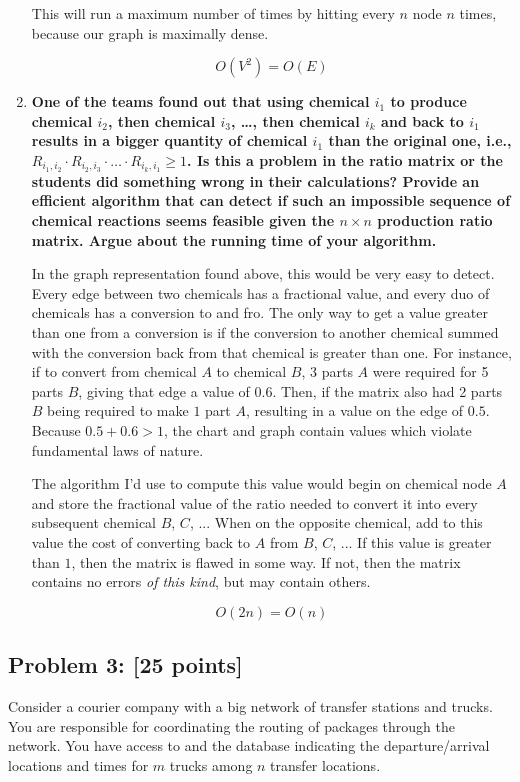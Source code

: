 \documentclass[11pt]{article}
\begin{document}
\begin{enumerate}[label=\textbf{\Alph*.}]
This will run a maximum number of times by hitting every $n$ node $n$ times,
because our graph is maximally dense.

$$O(V^2) = O(E)$$

\item  \textbf{One of the teams found out that using chemical
$i_1$ to produce chemical $i_2$, then chemical $i_3$, \dots, then
chemical $i_k$ and back to $i_1$ results in a bigger quantity of
chemical $i_1$ than the original one, i.e., $R_{i_1,i_2} \cdot
R_{i_2,i_3} \cdot \ldots \cdot R_{i_k,i_1} \geq 1$. Is this a problem
in the ratio matrix or the students did something wrong in their
calculations? Provide an efficient algorithm that can detect if such
an impossible sequence of chemical reactions seems feasible given the
$n \times n$ production ratio matrix. Argue about the running time of
your algorithm.}

In the graph representation found above, this would be very easy to
detect. Every edge between two chemicals has a fractional value, and
every duo of chemicals has a conversion to and fro. The only way
to get a value greater than one from a conversion is if the conversion
to another chemical summed with the conversion back from that chemical
is greater than one. For instance, if to convert from chemical $A$ to
chemical $B$, 3 parts $A$ were required for 5 parts $B$, giving that
edge a value of $0.6$. Then, if the matrix also had 2 parts $B$
being required to make $1$ part $A$, resulting in a value on the edge
of $0.5$. Because $0.5 + 0.6 > 1$, the chart and graph contain
values which violate fundamental laws of nature.

The algorithm I'd use to compute this value would begin on chemical 
node $A$ and store the fractional value of the ratio needed to convert
it into every subsequent chemical $B$, $C$, ... When on the opposite
chemical, add to this value the cost of converting back to $A$ from 
$B$, $C$, ... If this value is greater than $1$, then the matrix is
flawed in some way. If not, then the matrix contains no errors \emph{of
this kind}, but may contain others. 

$$O(2n) = O(n)$$

\end{enumerate}

\subsection*{Problem 3: [25 points]} Consider a courier company with
a big network of transfer stations and trucks. You are responsible for
coordinating the routing of packages through the network. You have
access to and the database indicating the departure/arrival locations
and times for $m$ trucks among $n$ transfer locations.\\
\end{document}
